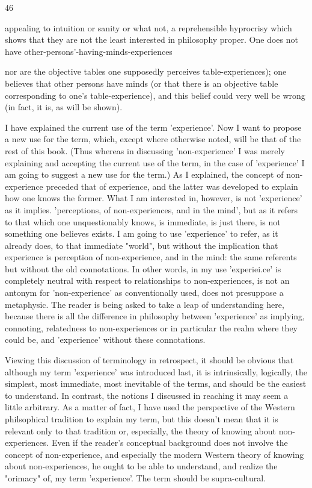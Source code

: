 \documentclass[10pt,twoside]{memoir}
\begin{document}
\begin{enumerate}
{{{{{{{{{{{46 


appealing to intuition or sanity or what not, a reprehensible hyprocrisy 
which shows that they are not the least interested in philosophy proper. One 
does not have other-persons'-having-minds-experiences {nor are the objective 
tables one supposedly perceives table-experiences); one believes that other 
persons have minds (or that there is an objective table corresponding to one's 
table-experience), and this belief could very well be wrong (in fact, it is, as 
will be shown). 

I have explained the current use of the term 'experience'. Now I want 
to propose a new use for the term, which, except where otherwise noted, 
will be that of the rest of this book. (Thus whereas in discussing 
'non-experience' I was merely explaining and accepting the current use of 
the term, in the case of 'experience' I am going to suggest a new use for the 
term.) As I explained, the concept of non-experience preceded that of 
experience, and the latter was developed to explain how one knows the 
former. What I am interested in, however, is not 'experience' as it implies. 
'perceptions, of non-experiences, and in the mind', but as it refers to that 
which one unquestionably knows, is immediate, is just there, is not 
something one believes exists. I am going to use 'experience' to refer, as it 
already does, to that immediate "world", but without the implication that 
experience is perception of non-experience, and in the mind: the same 
referents but without the old connotations. In other words, in my use 
'experiei.ce' is completely neutral with respect to relationships to 
non-experiences, is not an antonym for 'non-experience' as conventionally 
used, does not presuppose a metaphysic. The reader is being asked to take a 
leap of understanding here, because there is all the difference in philosophy 
between 'experience' as implying, connoting, relatedness to non-experiences 
or in particular the realm where they could be, and 'experience' without 
these connotations. 

Viewing this discussion of terminology in retrospect, it should be 
obvious that although my term 'experience' was introduced last, it is 
intrinsically, logically, the simplest, most immediate, most inevitable of the 
terms, and should be the easiest to understand. In contrast, the notions I 
discussed in reaching it may seem a little arbitrary. As a matter of fact, I 
have used the perspective of the Western philsophical tradition to explain my 
term, but this doesn't mean that it is relevant only to that tradition or, 
especially, the theory of knowing about non-experiences. Even if the reader's 
conceptual background does not involve the concept of non-experience, and 
especially the modern Western theory of knowing about non-experiences, he 
ought to be able to understand, and realize the "orimacy" of, my term 
'experience'. The term should be supra-cultural. 

}}}}}}}}}}}}
\end{enumerate}
\end{document}
